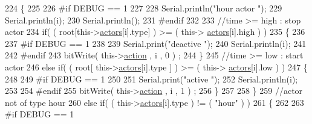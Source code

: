 \begin{DoxyCode}
224                     \{
225                     
226 \textcolor{preprocessor}{                    #if DEBUG == 1}
227                         
228                         Serial.println(\textcolor{stringliteral}{"hour actor "});
229                         Serial.println(i);
230                         Serial.println();
231 \textcolor{preprocessor}{                    #endif}
232 
233                         \textcolor{comment}{//time >= high : stop actor}
234                         \textcolor{keywordflow}{if}( ( root[this->\hyperlink{classJetpack_a7e16d2f97837f9712a2e6de1c50d99db}{actors}[i].type] ) >= ( this->
      \hyperlink{classJetpack_a7e16d2f97837f9712a2e6de1c50d99db}{actors}[i].high ) )    
235                         \{
236                         
237 \textcolor{preprocessor}{                        #if DEBUG == 1 }
238                             
239                             Serial.print(\textcolor{stringliteral}{"deactive "});
240                             Serial.println(i);
241                         
242 \textcolor{preprocessor}{                        #endif  }
243                             bitWrite( this->\hyperlink{classJetpack_aca3142925a7b0834b34ae91d26af7765}{action} , i , 0 ) ;    
244                         \}
245                         \textcolor{comment}{//time >= low : start actor}
246                         \textcolor{keywordflow}{else} \textcolor{keywordflow}{if}( ( root[ this->\hyperlink{classJetpack_a7e16d2f97837f9712a2e6de1c50d99db}{actors}[i].type ] ) >= ( this->
      \hyperlink{classJetpack_a7e16d2f97837f9712a2e6de1c50d99db}{actors}[i].low ) )
247                         \{
248                         
249 \textcolor{preprocessor}{                        #if DEBUG == 1 }
250                         
251                             Serial.print(\textcolor{stringliteral}{"active "});
252                             Serial.println(i);
253                         
254 \textcolor{preprocessor}{                        #endif}
255                             bitWrite( this->\hyperlink{classJetpack_aca3142925a7b0834b34ae91d26af7765}{action} , i , 1 ) ;                    
256                         \}
257                         
258                     \}
259                     \textcolor{comment}{//actor not of type hour}
260                     \textcolor{keywordflow}{else} \textcolor{keywordflow}{if}( ( this->\hyperlink{classJetpack_a7e16d2f97837f9712a2e6de1c50d99db}{actors}[i].type ) != ( \textcolor{stringliteral}{"hour"} ) )      
261                     \{
262                     
263 \textcolor{preprocessor}{                    #if DEBUG == 1 }

\end{DoxyCode}

